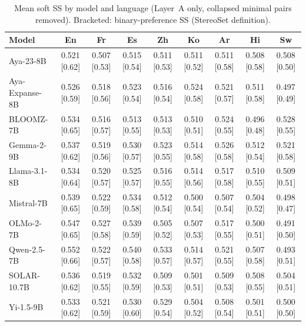 \begin{table}[t]
\centering
\small
\caption{Mean soft SS by model and language (Layer~A only, collapsed minimal pairs removed). Bracketed: binary-preference SS (StereoSet definition).}
\label{tab:ss_matrix}
\begin{tabular}{lcccccccc}
\toprule
\textbf{Model} & \textbf{En} & \textbf{Fr} & \textbf{Es} & \textbf{Zh} & \textbf{Ko} & \textbf{Ar} & \textbf{Hi} & \textbf{Sw} \\
\midrule
Aya-23-8B & 0.521 [0.62] & 0.507 [0.53] & 0.515 [0.54] & 0.511 [0.53] & 0.511 [0.52] & 0.511 [0.58] & 0.508 [0.58] & 0.508 [0.50] \\
Aya-Expanse-8B & 0.526 [0.59] & 0.518 [0.56] & 0.523 [0.54] & 0.516 [0.54] & 0.524 [0.58] & 0.521 [0.57] & 0.511 [0.58] & 0.497 [0.49] \\
BLOOMZ-7B & 0.534 [0.65] & 0.516 [0.57] & 0.513 [0.55] & 0.513 [0.53] & 0.510 [0.51] & 0.524 [0.55] & 0.496 [0.48] & 0.528 [0.55] \\
Gemma-2-9B & 0.537 [0.62] & 0.519 [0.56] & 0.530 [0.57] & 0.523 [0.55] & 0.514 [0.58] & 0.526 [0.58] & 0.512 [0.54] & 0.521 [0.58] \\
Llama-3.1-8B & 0.534 [0.64] & 0.520 [0.57] & 0.525 [0.57] & 0.516 [0.55] & 0.514 [0.56] & 0.517 [0.58] & 0.510 [0.55] & 0.509 [0.51] \\
Mistral-7B & 0.539 [0.65] & 0.522 [0.59] & 0.534 [0.58] & 0.512 [0.54] & 0.500 [0.54] & 0.507 [0.54] & 0.504 [0.52] & 0.498 [0.47] \\
OLMo-2-7B & 0.547 [0.65] & 0.527 [0.58] & 0.539 [0.59] & 0.505 [0.52] & 0.507 [0.53] & 0.517 [0.55] & 0.500 [0.51] & 0.491 [0.50] \\
Qwen-2.5-7B & 0.552 [0.66] & 0.522 [0.57] & 0.540 [0.58] & 0.533 [0.57] & 0.514 [0.57] & 0.521 [0.55] & 0.507 [0.58] & 0.493 [0.51] \\
SOLAR-10.7B & 0.536 [0.62] & 0.519 [0.55] & 0.532 [0.59] & 0.509 [0.53] & 0.501 [0.51] & 0.509 [0.53] & 0.508 [0.55] & 0.504 [0.51] \\
Yi-1.5-9B & 0.533 [0.62] & 0.521 [0.59] & 0.530 [0.60] & 0.529 [0.54] & 0.504 [0.52] & 0.508 [0.54] & 0.501 [0.51] & 0.500 [0.50] \\
\bottomrule
\end{tabular}
\end{table}
